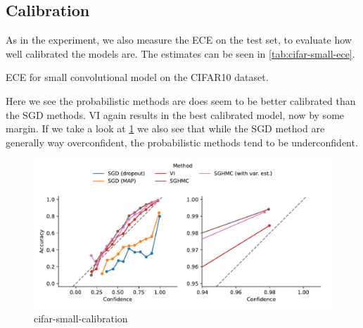 \subsection{Calibration}
As in the experiment, we also measure the ECE on the test set, to evaluate how well calibrated the models are.
The estimates can be seen in \cref{tab:cifar-small-ece}.
\begin{table}[htbp]
    \centering
    
    \caption{ECE for small convolutional model on the CIFAR10 dataset.}
    \label{tab:cifar-small-ece}
\end{table}
Here we see the probabilistic methods are does seem to be better calibrated than the SGD methods.
VI again results in the best calibrated model, now by some margin.
If we take a look at \cref{fig:cifar-small-calibration} we also see that while the SGD method are generally way overconfident, the probabilistic methods tend to be underconfident.
\begin{figure}[htbp]
    \centering
    \includegraphics[width=\linewidth]{Figures/cifar-small-calibration.pdf}
    \caption{cifar-small-calibration}
    \label{fig:cifar-small-calibration}
\end{figure}
